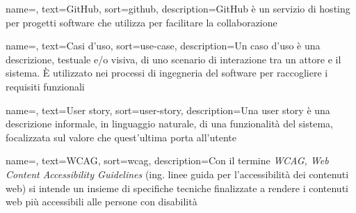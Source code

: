  {
    name=,
    text=GitHub,
    sort=github,
    description={GitHub è un servizio di hosting per progetti software che utilizza  per facilitare la collaborazione}
}

 {
    name=,
    text=Casi d'uso,
    sort=use-case,
    description={Un caso d'uso è una descrizione, testuale e/o visiva, di uno scenario di interazione tra un attore e il sistema. È utilizzato nei processi di ingegneria del software per raccogliere i requisiti funzionali}
}

 {
    name=,
    text=User story,
    sort=user-story,
    description={Una user story è una descrizione informale, in linguaggio naturale, di una funzionalità del sistema, focalizzata sul valore che quest'ultima porta all'utente}
}

 {
    name=,
    text=WCAG,
    sort=wcag,
    description={Con il termine \emph{WCAG, Web Content Accessibility Guidelines} (ing. linee guida per l'accessibilità dei contenuti web) si intende un insieme di specifiche tecniche finalizzate a rendere i contenuti web più accessibili alle persone con disabilità}
}


